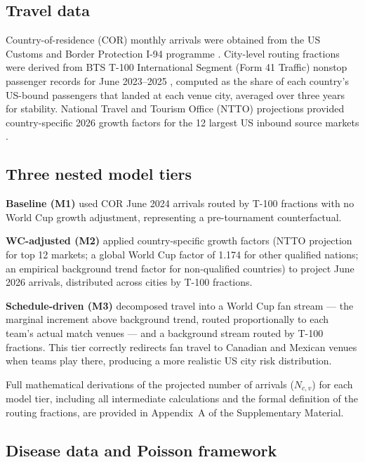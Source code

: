 \documentclass[12pt, a4paper]{article}
\begin{document}
\subsection{Travel data}

Country-of-residence (COR) monthly arrivals were obtained from the US Customs and Border Protection I-94 programme \citep{CBP_I94}. City-level routing fractions were derived from BTS T-100 International Segment (Form 41 Traffic) nonstop passenger records for June 2023--2025 \citep{BTS_T100}, computed as the share of each country's US-bound passengers that landed at each venue city, averaged over three years for stability. National Travel and Tourism Office (NTTO) projections provided country-specific 2026 growth factors for the 12 largest US inbound source markets \citep{NTTO2025}.

\subsection{Three nested model tiers}

\textbf{Baseline (M1)} used COR June 2024 arrivals routed by T-100 fractions with no World Cup growth adjustment, representing a pre-tournament counterfactual.

\textbf{WC-adjusted (M2)} applied country-specific growth factors (NTTO projection for top 12 markets; a global World Cup factor of 1.174 for other qualified nations; an empirical background trend factor for non-qualified countries) to project June 2026 arrivals, distributed across cities by T-100 fractions.

\textbf{Schedule-driven (M3)} decomposed travel into a World Cup fan stream --- the marginal increment above background trend, routed proportionally to each team's actual match venues --- and a background stream routed by T-100 fractions. This tier correctly redirects fan travel to Canadian and Mexican venues when teams play there, producing a more realistic US city risk distribution. 

Full mathematical derivations of the projected number of arrivals ($N_{c,v}$) for each model tier, including all intermediate calculations and the formal definition of the routing fractions, are provided in Appendix~A of the Supplementary Material.

\subsection{Disease data and Poisson framework}
\end{document}
